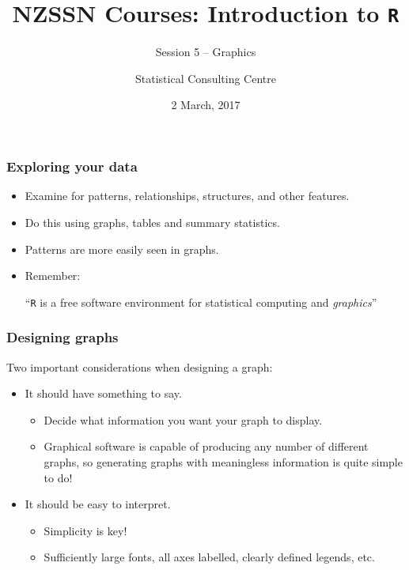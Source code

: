 \documentclass{beamer}\usepackage[]{graphicx}\usepackage[]{color}
\author[SCC]{Statistical Consulting Centre}%
\institute[\href{mailto:consulting@stat.auckland.ac.nz}
  {consulting@stat.auckland.ac.nz}]{\href{mailto:consulting@stat.auckland.ac.nz}
  {consulting@stat.auckland.ac.nz}\\
The Department of Statistics\\
The University of Auckland}
\title[Session 5 -- Graphics]{NZSSN Courses: Introduction to \texttt{R}}
\subtitle{Session 5 -- Graphics}
\date{2 March, 2017}
\begin{document}
\maketitle

\begin{frame}[fragile]
  \frametitle{Exploring your data}

\begin{itemize}
  \item Examine for patterns, relationships, structures, and
    other features.
  \item Do this using graphs, tables and summary statistics.
  \item Patterns are more easily seen in graphs.
  \item Remember:
    \begin{center}
      ``\texttt{R} is a free software environment for statistical computing and \emph{graphics}''
    \end{center}
\end{itemize}
\end{frame}


\begin{frame}
  \frametitle{Designing graphs}
Two important considerations when designing a graph:
\vspace{0.5cm}
\begin{itemize}
\item It should have something to say.
  \begin{itemize}
  \item Decide what information you want your graph to display.
  \item Graphical software is capable of producing any number of different graphs, so generating graphs with meaningless information is quite simple to do!
  \end{itemize}
\item It should be easy to interpret.
  \begin{itemize}
  \item Simplicity is key!
  \item Sufficiently large fonts, all axes labelled, clearly defined legends, etc.
  \end{itemize}
\end{itemize}
\end{frame}
\end{document}
